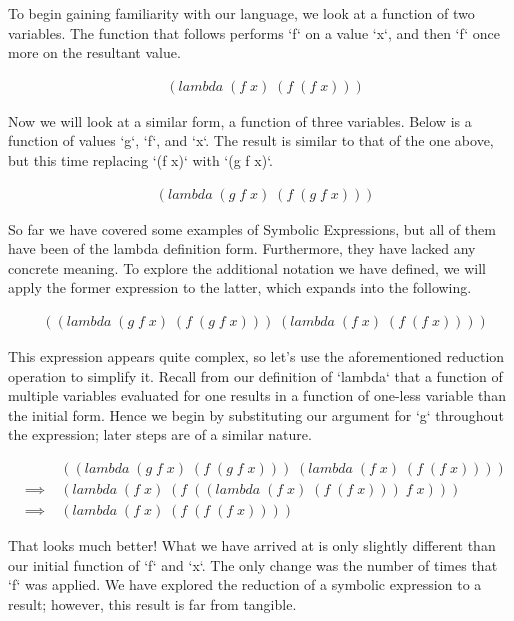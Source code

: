 To begin gaining familiarity with our language, we look at a function of two
variables. The function that follows performs `f` on a value `x`, and then `f`
once more on the resultant value.

\begin{align*}
& (lambda \; (f \; x) \; (f \; (f \; x)))
\end{align*}

Now we will look at a similar form, a function of three variables. Below is a
function of values `g`, `f`, and `x`. The result is similar to that of the one
above, but this time replacing `(f x)` with `(g f x)`.

\begin{align*}
& (lambda \; (g \; f \; x) \; (f \; (g \; f \; x)))
\end{align*}

So far we have covered some examples of Symbolic Expressions, but all of them have 
been of the lambda definition form. Furthermore, they have lacked any concrete
meaning. To explore the additional notation we have defined, we will apply the
former expression to the latter, which expands into the following.

\begin{align*}
& ((lambda \; (g \; f \; x) \; (f \; (g \; f \; x))) \; (lambda \; (f \; x) \; (f \; (f \; x))))
\end{align*}

This expression appears quite complex, so let's use the aforementioned reduction 
operation to simplify it. Recall from our definition of `lambda` that a function
of multiple variables evaluated for one results in a function of one-less variable 
than the initial form. Hence we begin by substituting our argument for `g`
throughout the expression; later steps are of a similar nature.

\begin{align*}
& &((lambda \; (g \; f \; x) \; (f \; (g \; f \; x))) \; (lambda \; (f \; x) \; (f \; (f \; x))))
\\& \implies \; &(lambda \; (f \; x) \; (f \; ((lambda \; (f \; x) \; (f \; (f \; x))) \; f \; x)))
\\& \implies \; &(lambda \; (f \; x) \; (f \; (f \; (f \; x))))
\end{align*}

That looks much better! What we have arrived at is only slightly different than
our initial function of `f` and `x`. The only change was the number of times that
`f` was applied. We have explored the reduction of a symbolic expression to a
result; however, this result is far from tangible.

